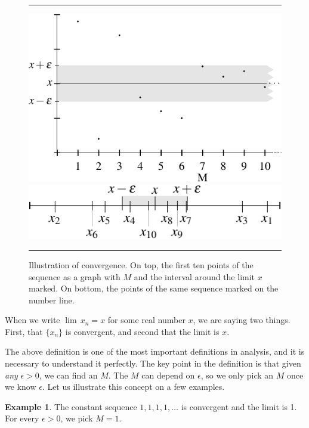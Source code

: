 \documentclass[12pt]{book}
\newenvironment{myfigureht}{%
\begin{figure}[h!t]
\noindent\rule{\textwidth}{0.4pt}\vspace{12pt}\par\centering}%
{\par\noindent\rule{\textwidth}{0.4pt}
\end{figure}}
\theoremstyle{plain}
\theoremstyle{remark}
\theoremstyle{definition}
\theoremstyle{exercise}
\theoremstyle{example}
\newtheorem{example}[thm]{Example}
\begin{document}
\begin{myfigureht}
\includegraphics{figures/sequence-convergence}

\vspace*{12pt}

\hspace{13pt}
\includegraphics{figures/sequence-convergence-2}
\caption{Illustration of convergence.  On top, the first ten points of the sequence as a graph
with $M$ and the interval around the limit $x$ marked.  On bottom, the points of the same sequence marked on the
number line.\label{figsequenceconvergence}}
\end{myfigureht}

When we write $\lim\, x_n = x$ for some real number $x$, we are saying two
things.  First, that $\{ x_n \}$ is convergent, and second that the limit is
$x$.

The above definition is one of the most important definitions in analysis,
and it is necessary to understand it perfectly.  The key point in the
definition is that given \emph{any} $\epsilon > 0$, we can find an $M$.  The
$M$ can depend on $\epsilon$, so we only pick an $M$ once we know
$\epsilon$.  Let us illustrate this concept on a few examples.

\begin{example}
The constant sequence $1,1,1,1,\ldots$ is convergent and the limit is 1.  For
every $\epsilon > 0$, we pick $M = 1$.
\end{example}
\end{document}
